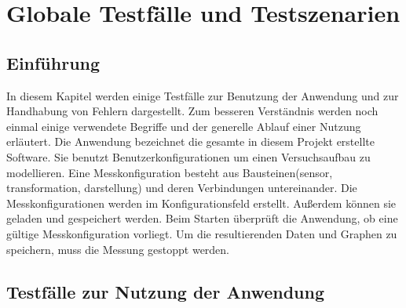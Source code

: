 \documentclass[parskip=full]{scrartcl}
\begin{document}
\clearpage
\section{Globale Testfälle und Testszenarien}\label{testfall}

\subsection{Einführung}

In diesem Kapitel werden einige Testfälle zur Benutzung der Anwendung und zur Handhabung von Fehlern dargestellt. Zum besseren Verständnis werden noch einmal einige verwendete Begriffe und der generelle Ablauf einer Nutzung erläutert. Die Anwendung bezeichnet die gesamte in diesem Projekt erstellte Software. Sie benutzt \gls{Benutzerkonfiguration}en um einen Versuchsaufbau zu modellieren. Eine Messkonfiguration besteht aus Bausteinen(\gls{sensor}, \gls{transformation}, \gls{darstellung}) und deren Verbindungen untereinander. Die Messkonfigurationen werden im Konfigurationsfeld erstellt. Außerdem können sie geladen und gespeichert werden. Beim Starten überprüft die Anwendung, ob eine gültige Messkonfiguration vorliegt. Um die resultierenden Daten und Graphen zu speichern, muss die Messung gestoppt werden.

\subsection{Testfälle zur Nutzung der Anwendung}
\end{document}
